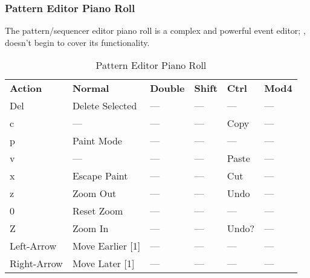 \subsubsection{Pattern Editor Piano Roll}
\label{subsubsec:kbd_mouse_pattern_editor_piano_roll}

   The pattern/sequencer editor piano roll is a complex and powerful event
   editor;
   ,
   doesn't begin to cover its functionality.

   \begin{table}
      \centering
      \caption{Pattern Editor Piano Roll}
      \label{table:pattern_editor_piano_roll}
      \begin{tabular}{l l l l l l}
         \textbf{Action}   & \textbf{Normal} & \textbf{Double}    & 
            \textbf{Shift} & \textbf{Ctrl}   & \textbf{Mod4}      \\
         Del               & Delete Selected & ---                &
            ---            & ---             & ---                \\
         c                 & ---             & ---                &
            ---            & Copy            & ---                \\
         p                 & Paint Mode      & ---                &
            ---            & ---             & ---                \\
         v                 & ---             & ---                &
            ---            & Paste           & ---                \\
         x                 & Escape Paint    & ---                &
            ---            & Cut             & ---                \\
         z                 & Zoom Out        & ---                &
            ---            & Undo            & ---                \\
         0                 & Reset Zoom      & ---                &
            ---            & ---             & ---                \\
         Z                 & Zoom In         & ---                &
            ---            & Undo?           & ---                \\
         Left-Arrow        & Move Earlier [1] & ---               &
            ---            & ---             & ---                \\
         Right-Arrow       & Move Later [1]  & ---                &
            ---            & ---             & ---                \\

\end{tabular}
\end{table}
